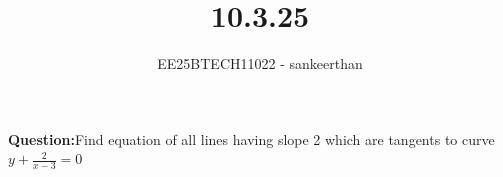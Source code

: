 \documentclass[journal]{IEEEtran}
\begin{document}


\title{10.3.25}
\author{EE25BTECH11022 - sankeerthan}
{\let\newpage\relax\maketitle}

\renewcommand{\thefigure}{\theenumi}
\renewcommand{\thetable}{\theenumi}
\setlength{\intextsep}{10pt} %


\renewcommand{\thetable}{\theenumi}

\textbf{Question:}Find equation of all lines having slope 2 which are tangents to curve $y+\frac{2}{x-3}=0$
\end{document}
